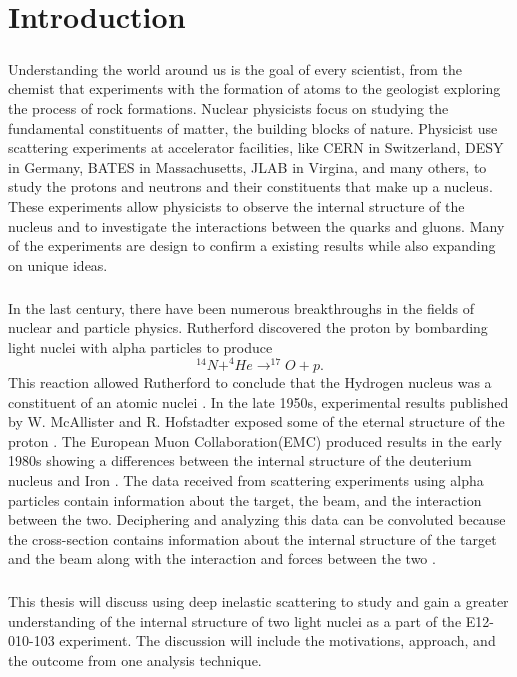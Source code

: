 


\chapter{Introduction}\paragraph{}Understanding the world around us is the goal of every scientist, from the chemist that experiments with the formation of atoms to the geologist exploring the process of rock formations. Nuclear physicists focus on studying the fundamental constituents of matter, the building blocks of nature. Physicist use scattering experiments at accelerator facilities, like CERN in Switzerland, DESY in Germany, BATES in Massachusetts, JLAB in Virgina, and many others, to study the protons and neutrons and their constituents that make up a nucleus. These experiments allow physicists to observe the internal structure of the nucleus and to investigate the interactions between the quarks and gluons. Many of the experiments are design to confirm a existing results while also expanding on unique ideas.
\paragraph{}In the last century, there have been numerous breakthroughs in the fields of nuclear and particle physics. Rutherford discovered the proton by bombarding light nuclei with alpha particles to produce 
	\begin{equation}
	^{14}N + ^4He \rightarrow ^{17}O + p.
	\end{equation}
This reaction allowed Rutherford to conclude that the Hydrogen nucleus was a constituent of an atomic nuclei \cite{PnN}. In the late 1950s, experimental results published by W. McAllister and R. Hofstadter exposed some of the eternal structure of the proton \cite{Flay,Hof}. The European Muon Collaboration(EMC) produced results in the early 1980s showing a differences between the internal structure of the deuterium nucleus and Iron \cite{seeley,CC}. The data received from scattering experiments using alpha particles contain information about the target, the beam, and the interaction between the two. Deciphering and analyzing this data can be convoluted because the cross-section contains information about the internal structure of the target and the beam along with the interaction and forces between the two \cite{PnN}. 
\paragraph{}This thesis will discuss using deep inelastic scattering to study and gain a greater understanding of the internal structure of two light nuclei as a part of the E12-010-103 experiment. The discussion will include the motivations, approach, and the outcome from one analysis technique.
